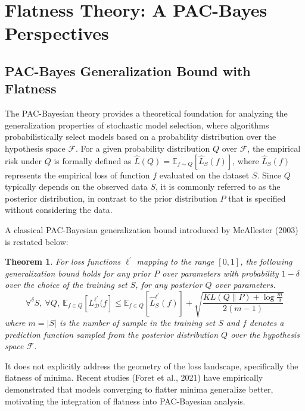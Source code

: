 \documentclass[letterpaper]{article} %
\newtheorem{theorem}{Theorem}
\begin{document}
\section{Flatness Theory: A PAC-Bayes Perspectives}
\subsection{PAC-Bayes Generalization Bound with Flatness}
The PAC-Bayesian theory provides a theoretical foundation for analyzing the generalization properties of stochastic model selection, where algorithms probabilistically select models based on a probability distribution over the hypothesis space \(\mathcal{F}\). For a given probability distribution \(Q\) over \(\mathcal{F}\), the empirical risk under \(Q\) is formally defined as \(\hat{L}(Q) = \mathbb{E}_{f \sim Q}[\hat{L}_S(f)]\), where \(\hat{L}_S(f)\) represents the empirical loss of function \(f\) evaluated on the dataset \(S\). Since \(Q\) typically depends on the observed data \(S\), it is commonly referred to as the posterior distribution, in contrast to the prior distribution \(P\) that is specified without considering the data. 

A classical PAC-Bayesian generalization bound introduced by McAllester (2003) is restated below:
\begin{theorem} \label{the: PAC1999}
\citep{mcallesterPACBayesianStochasticModel2003}
For loss functions $\ell^{'}$ mapping to the range $[0,1]$, the following generalization bound holds for any prior $P$ over parameters with probability $1 - \delta$ over the choice of the training set $S$, for any posterior $Q$ over parameters.
\begin{equation}\label{eq: PAC2003}
     \forall^{\delta}S,\ \forall Q,\ \mathbb{E}_{f \in Q}[L_{\mathcal{D}}^{\ell^{'}}(f] \leq  \mathbb{E}_{f \in Q}[\hat{L}^{\ell^{'}}_{S}(f)] +\sqrt{\frac{KL(Q\|P)+\log \frac{m}{\delta}}{2(m-1)}}
\end{equation}
where $m=|S|$ is the number of sample in the training set $S$ and $f$ denotes a prediction function sampled from the posterior distribution $Q$ over the hypothesis space $\mathcal{F}$.
\end{theorem}


 It does not explicitly address the geometry of the loss landscape, specifically the flatness of minima. Recent studies (Foret et al., 2021) have empirically demonstrated that models converging to flatter minima generalize better, motivating the integration of flatness into PAC-Bayesian analysis.
 
\end{document}
